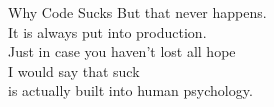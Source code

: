 \documentclass[bigger]{beamer}
\begin{document}
\begin{frame}{Why Code Sucks}
{    But that never happens.\\
    It is always put into production.\\
    \vfil
    Just in case you haven't lost all hope\\
    I would say that suck\\
    is actually built into human psychology.\\
  }
\end{frame}
\end{document}
